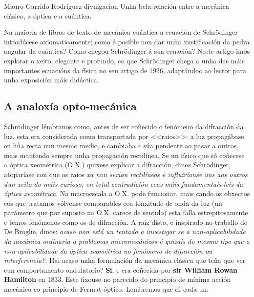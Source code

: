 \Titular*%
{De onde xorde a ecuación de Schrödinger?}%
{Mauro Garrido Rodríguez}%
{divulgacion}%
{Unha bela relación entre a mecánica clásica, a óptica e a cuántica.}%

\begin{refsection}
\begin{multicols}{2}


Na maioría de libros de texto de mecánica cuántica a ecuación de Schrödinger
introdúcese axiomaticamente; como é posible non dar unha xustificación da pedra
angular da cuántica? Como chegou Schrödinger á súa ecuación? Neste artigo imos
explorar o xeito, elegante e profundo, co que Schrödinger chega a unha das máis
importantes ecuacións da física no seu artigo de 1926, adaptándoo ao lector
para unha exposición máis didáctica.

\subsection*{A analoxía opto-mecánica}

Schrödinger lémbranos como, antes de ser coñecido o fenómeno da difracción da
luz, esta era considerada como transportada por <<raios>>: a luz propagábase en
liña recta nun mesmo medio, e cambiaba a súa pendente ao pasar a outros, mais
mantendo sempre unha propagación rectilínea. Se un físico que só coñecese a
óptica xeométrica (O.X.) quixese explicar a difracción, dinos Schrödinger,
atoparíase con que os raios \textit{xa non serían rectilíneos e influiríanse
uns aos outros dun xeito do máis curioso, en total contradición coas máis
fundamentais leis da óptica xeométrica}. Na macroescala a O.X. pode funcionar,
mais cando os obxectos cos que tratamos vólvense comparables coa lonxitude de
onda da luz (un parámetro que por suposto na O.X. carece de sentido) esta falla
estrepitosamente e temos fenómenos como os de difracción. A raíz disto, e
inspirado no traballo de De Broglie, dinos: \textit{acaso non está un tentado a
investigar se a non-aplicabilidade da mecánica ordinaria a problemas
micromecánicos é quizais do mesmo tipo que a non-aplicabilidade da óptica
xeométrica no fenómeno de difracción ou interferencia?}. Hai acaso unha
formulación da mecánica clásica que teña que ver cun comportamento ondulatorio?
\textbf{Si}, e era coñecida por \textbf{sir William Rowan Hamilton} en 1833.
Este fixouse no parecido do principio de mínima acción mecánico co principio de
Fermat óptico. Lembremos que di cada un:

\begin{itemize}


\end{itemize}
\end{multicols}
\end{refsection}
